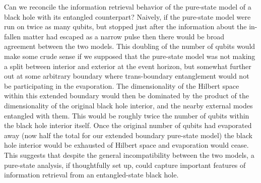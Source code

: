 \documentclass[aps,12pt]{revtex4}
\begin{document}
Can we reconcile the information retrieval behavior of the pure-state
model of a black hole with its entangled counterpart? Naively,
if the pure-state model were run on twice as many qubits, but stopped
just after the information about the in-fallen matter had escaped
as a narrow pulse then there would be broad agreement between the
two models. This doubling of the number of qubits would make some
crude sense if we supposed that the pure-state model was not making
a split between interior and exterior at the event horizon, but
somewhat further out at some arbitrary boundary where trans-boundary
entanglement would not be participating in the evaporation. The
dimensionality of the Hilbert space within this extended boundary
would then be dominated by the product of the dimensionality of the
original black hole interior, and the nearby external modes entangled
with them. This would be roughly twice the number of qubits within the
black hole interior itself. Once the original number of qubits had
evaporated away (now half the total for our extended boundary
pure-state model) the black hole interior would be exhausted of
Hilbert space and evaporation would cease. This suggests that
despite the general incompatibility between the two models, a
pure-state analysis, if thoughtfully set up, could capture important
features of information retrieval from an entangled-state black hole.
\end{document}
